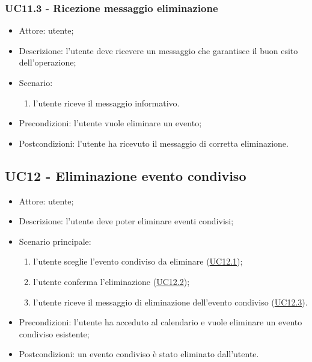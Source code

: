 \subsubsection{UC11.3 - Ricezione messaggio eliminazione} \label{sec: UC11.3}
\begin{itemize}
    \item Attore: utente;
    \item Descrizione: l'utente deve ricevere un messaggio che garantisce il buon esito dell'operazione;
    \item Scenario:
        \begin{enumerate}
        \item l'utente riceve il messaggio informativo.
        \end{enumerate}
    
    \item Precondizioni: l'utente vuole eliminare un evento;
    \item Postcondizioni: l'utente ha ricevuto il messaggio di corretta eliminazione.
\end{itemize}


\subsection{UC12 - Eliminazione evento condiviso}
\begin{itemize}
    \item Attore: utente;
    \item Descrizione: l'utente deve poter eliminare eventi condivisi;
    \item Scenario principale:
        \begin{enumerate}
        \item l'utente sceglie l'evento condiviso da eliminare (\hyperref[sec: UC12.1]{UC12.1});
        \item l'utente conferma l'eliminazione (\hyperref[sec: UC12.2]{UC12.2});
        \item l'utente riceve il messaggio di eliminazione dell'evento condiviso (\hyperref[sec: UC12.3]{UC12.3}).
        \end{enumerate}
    \item Precondizioni: l'utente ha acceduto al calendario e vuole eliminare un evento condiviso esistente;
    \item Postcondizioni: un evento condiviso è stato eliminato dall'utente.
\end{itemize}

